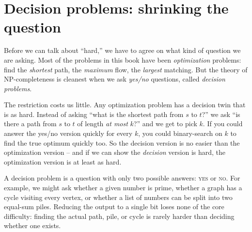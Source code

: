 \section{Decision problems: shrinking the question}

Before we can talk about ``hard,'' we have to agree on what kind of question we
are asking. Most of the problems in this book have been \emph{optimization}
problems: find the \emph{shortest} path, the \emph{maximum} flow, the
\emph{largest} matching. But the theory of NP-completeness is cleanest when we
ask \emph{yes/no} questions, called \emph{decision problems}.

The restriction costs us little. Any optimization problem has
a decision twin that is as hard. Instead of asking ``what is the
shortest path from $s$ to $t$?'' we ask ``is there a path from $s$ to $t$ of
length \emph{at most} $k$?'' and we get to pick $k$. If you could answer the
yes/no version quickly for every $k$, you could binary-search on $k$ to find the
true optimum quickly too. So the decision version is no easier than the
optimization version -- and if we can show the \emph{decision} version is hard,
the optimization version is at least as hard.

\begin{intuitionbox}
A decision problem is a question with only two possible answers: \textsc{yes} or
\textsc{no}. For example, we might ask whether a given number is prime, whether
a graph has a cycle visiting every vertex, or whether a list of numbers can be
split into two equal-sum piles. Reducing the output to a single bit loses none
of the core difficulty: finding the actual path, pile, or cycle is rarely harder
than deciding whether one exists.
\end{intuitionbox}

